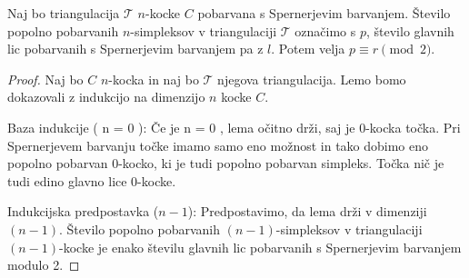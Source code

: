 \documentclass[mat1]{fmfdelo}
\newcommand{\0}{0}
\newcommand{\pT}{\mathcal T}
\begin{document}
\begin{lema}\label{izr:kubsperner}
Naj bo triangulacija $\mathcal{T}$ $n$-kocke $C$ pobarvana s Spernerjevim barvanjem. Število popolno pobarvanih $n$-simpleksov v triangulaciji $\mathcal{T}$ označimo s $p$, število glavnih lic pobarvanih s Spernerjevim barvanjem pa z $l$. Potem velja $p \equiv r \pmod 2$.
\end{lema}
\begin{proof}
Naj bo $C$ $n$-kocka in naj bo $\pT$ njegova triangulacija. Lemo bomo dokazovali z indukcijo na dimenzijo $n$ kocke $C$.

Baza indukcije ( n = 0 ): Če je n = 0 , lema očitno drži, saj je 0-kocka točka. Pri
Spernerjevem barvanju točke imamo samo eno možnost in tako dobimo eno popolno
pobarvan 0-kocko, ki je tudi popolno pobarvan simpleks. Točka nič je tudi edino glavno lice 0-kocke.

Indukcijska predpostavka ($n - 1$):
Predpostavimo, da lema drži v dimenziji $(n - 1)$. Število popolno pobarvanih $(n-1)$-simpleksov v triangulaciji $(n-1)$-kocke je enako številu glavnih lic pobarvanih s Spernerjevim barvanjem modulo 2.


\end{proof}
\end{document}
